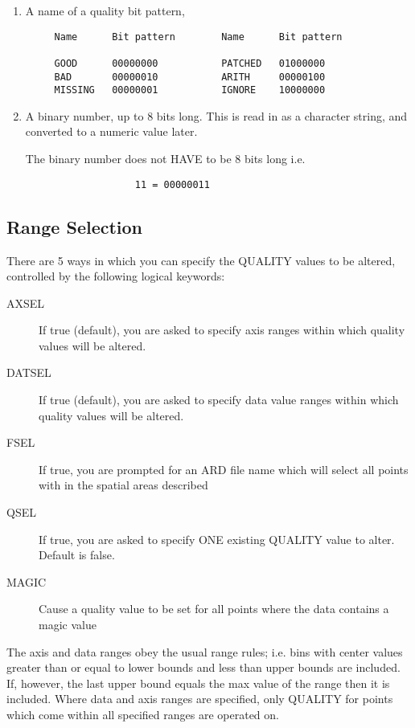 \documentclass{book}
\renewcommand{\_}{{\tt\char'137}}     %
\begin{document}
 
\begin{enumerate}
\item A name of a quality bit pattern,
\begin{verbatim}
     Name      Bit pattern        Name      Bit pattern
 
     GOOD      00000000           PATCHED   01000000
     BAD       00000010           ARITH     00000100
     MISSING   00000001           IGNORE    10000000
\end{verbatim}
\item A binary number, up to 8 bits long. This is read in as a
character string, and converted to a numeric value later.
 
The binary number does not HAVE to be 8 bits long i.e.
\begin{verbatim}
                   11 = 00000011
\end{verbatim}
\end{enumerate}
\subsection{Range Selection}
There are 5 ways in which you can specify the QUALITY values to
be altered, controlled by the following logical keywords:
 
 
\begin{description}
\item[AXSEL]
If true (default), you are asked to specify axis
ranges within which quality values will be altered.
\item[DATSEL]
If true (default), you are asked to specify data
value ranges within which quality values will be
altered.
\item[FSEL]
If true, you are prompted for an ARD file name
which will select all points with in the spatial
areas described
\item[QSEL]
If true, you are asked to specify ONE existing
QUALITY value to alter. Default is false.
\item[MAGIC]
Cause a quality value to be set for all points
where the data contains a magic value
\end{description}
The axis and data ranges obey the usual range rules; i.e. bins
with center values greater than or equal to lower bounds and less
than upper bounds are included. If, however, the last upper bound
equals the max value of the range then it is included. Where data
and axis ranges are specified, only QUALITY for points which come
within all specified ranges are operated on.
 
\end{document}
